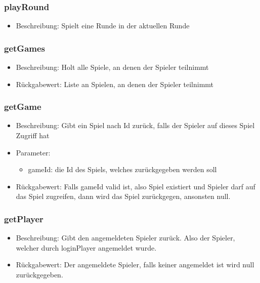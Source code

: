 \documentclass[a4paper]{scrreprt}
\begin{document}
    \subsubsection{playRound}
    \begin{itemize}
        \item Beschreibung: Spielt eine Runde in der aktuellen Runde
    \end{itemize}
    \subsubsection{getGames}
    \begin{itemize}
        \item Beschreibung: Holt alle Spiele, an denen der Spieler teilnimmt
        \item Rückgabewert: Liste an Spielen, an denen der Spieler teilnimmt 
    \end{itemize}
    \subsubsection{getGame}
    \begin{itemize}
        \item Beschreibung: Gibt ein Spiel nach Id zurück, falls der Spieler auf dieses Spiel Zugriff hat
        \item Parameter:
        \begin{itemize}
            \item gameId: die Id des Spiels, welches zurückgegeben werden soll
        \end{itemize}
        \item Rückgabewert: Falls gameId valid ist, also Spiel existiert und Spieler darf auf das Spiel zugreifen, dann wird das Spiel zurückgegen, ansonsten null. 
    \end{itemize}
    \subsubsection{getPlayer}
    \begin{itemize}
        \item Beschreibung: Gibt den angemeldeten Spieler zurück. Also der Spieler, welcher durch loginPlayer angemeldet wurde.
        \item Rückgabewert: Der angemeldete Spieler, falls keiner angemeldet ist wird null zurückgegeben. 
    \end{itemize}
\end{document}
